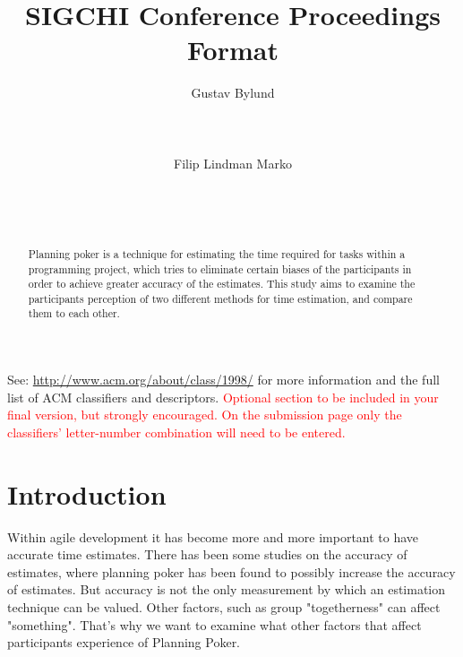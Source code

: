 \documentclass{sigchi}
\begin{document}
\title{SIGCHI Conference Proceedings Format}

\author{
  \alignauthor Gustav Bylund\\
    \\
    \\
    \\
  \alignauthor Filip Lindman Marko\\
    \\
    \\
    \\
}

\maketitle

\begin{abstract}
Planning poker is a technique for estimating the time required for tasks
within a programming project, which tries to eliminate certain biases of
the participants in order to achieve greater accuracy of the estimates.
This study aims to examine the participants perception of two different
methods for time estimation, and compare them to each other.
\end{abstract}



See: \url{http://www.acm.org/about/class/1998/}
for more information and the full list of ACM classifiers
and descriptors. \newline
\textcolor{red}{Optional section to be included in your final version,
but strongly encouraged. On the submission page only the classifiers’
letter-number combination will need to be entered.}

\section{Introduction}
Within agile development it has become more and more important to have accurate time estimates. There has been some studies on the accuracy of estimates, where planning poker has been found to possibly increase the accuracy of estimates.
But accuracy is not the only measurement by which an estimation technique can be valued. Other factors, such as group "togetherness" can affect "something". That's why we want to examine what other factors that affect participants experience of Planning Poker.
\end{document}
